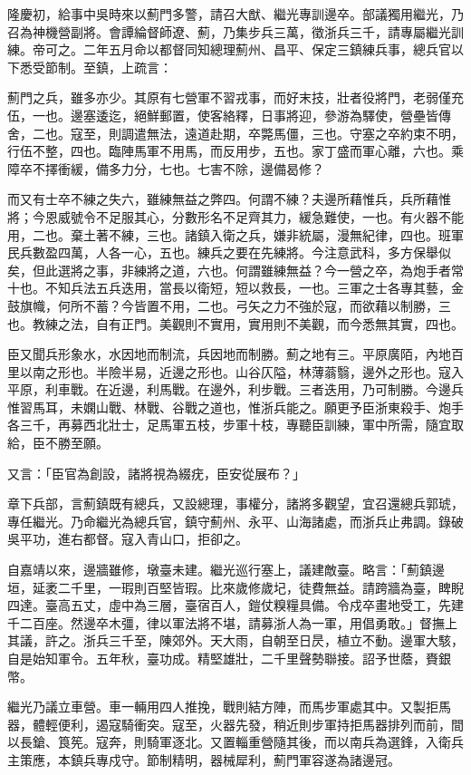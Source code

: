 \begin{pinyinscope}
隆慶初，給事中吳時來以薊門多警，請召大猷、繼光專訓邊卒。部議獨用繼光，乃召為神機營副將。會譚綸督師遼、薊，乃集步兵三萬，徵浙兵三千，請專屬繼光訓練。帝可之。二年五月命以都督同知總理薊州、昌平、保定三鎮練兵事，總兵官以下悉受節制。至鎮，上疏言：

薊門之兵，雖多亦少。其原有七營軍不習戎事，而好末技，壯者役將門，老弱僅充伍，一也。邊塞逶迄，絕鮮郵置，使客絡釋，日事將迎，參游為驛使，營壘皆傳舍，二也。寇至，則調遣無法，遠道赴期，卒斃馬僵，三也。守塞之卒約束不明，行伍不整，四也。臨陣馬軍不用馬，而反用步，五也。家丁盛而軍心離，六也。乘障卒不擇衝緩，備多力分，七也。七害不除，邊備曷修？

而又有士卒不練之失六，雖練無益之弊四。何謂不練？夫邊所藉惟兵，兵所藉惟將；今恩威號令不足服其心，分數形名不足齊其力，緩急難使，一也。有火器不能用，二也。棄土著不練，三也。諸鎮入衛之兵，嫌非統屬，漫無紀律，四也。班軍民兵數盈四萬，人各一心，五也。練兵之要在先練將。今注意武科，多方保舉似矣，但此選將之事，非練將之道，六也。何謂雖練無益？今一營之卒，為炮手者常十也。不知兵法五兵迭用，當長以衛短，短以救長，一也。三軍之士各專其藝，金鼓旗幟，何所不蓄？今皆置不用，二也。弓矢之力不強於寇，而欲藉以制勝，三也。教練之法，自有正門。美觀則不實用，實用則不美觀，而今悉無其實，四也。

臣又聞兵形象水，水因地而制流，兵因地而制勝。薊之地有三。平原廣陌，內地百里以南之形也。半險半易，近邊之形也。山谷仄隘，林薄蓊翳，邊外之形也。寇入平原，利車戰。在近邊，利馬戰。在邊外，利步戰。三者迭用，乃可制勝。今邊兵惟習馬耳，未嫻山戰、林戰、谷戰之道也，惟浙兵能之。願更予臣浙東殺手、炮手各三千，再募西北壯士，足馬軍五枝，步軍十枝，專聽臣訓練，軍中所需，隨宜取給，臣不勝至願。

又言：「臣官為創設，諸將視為綴疣，臣安從展布？」

章下兵部，言薊鎮既有總兵，又設總理，事權分，諸將多觀望，宜召還總兵郭琥，專任繼光。乃命繼光為總兵官，鎮守薊州、永平、山海諸處，而浙兵止弗調。錄破吳平功，進右都督。寇入青山口，拒卻之。

自嘉靖以來，邊牆雖修，墩臺未建。繼光巡行塞上，議建敵臺。略言：「薊鎮邊垣，延袤二千里，一瑕則百堅皆瑕。比來歲修歲圮，徒費無益。請跨牆為臺，睥睨四達。臺高五丈，虛中為三層，臺宿百人，鎧仗糗糧具備。令戍卒畫地受工，先建千二百座。然邊卒木彊，律以軍法將不堪，請募浙人為一軍，用倡勇敢。」督撫上其議，許之。浙兵三千至，陳郊外。天大雨，自朝至日昃，植立不動。邊軍大駭，自是始知軍令。五年秋，臺功成。精堅雄壯，二千里聲勢聯接。詔予世蔭，賚銀幣。

繼光乃議立車營。車一輛用四人推挽，戰則結方陣，而馬步軍處其中。又製拒馬器，體輕便利，遏寇騎衝突。寇至，火器先發，稍近則步軍持拒馬器排列而前，間以長鎗、筤筅。寇奔，則騎軍逐北。又置輜重營隨其後，而以南兵為選鋒，入衛兵主策應，本鎮兵專戍守。節制精明，器械犀利，薊門軍容遂為諸邊冠。


\end{pinyinscope}
